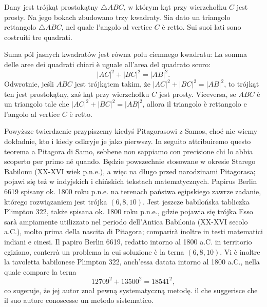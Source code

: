 \begin{theorem}
[Pitagorasa] %
[di Pitagora] %
\label{theorem_pythagorean}%
    Dany jest trójkąt prostokątny $\triangle ABC$, w którym kąt przy wierzchołku $C$ jest prosty. %
    Na jego bokach zbudowano trzy kwadraty. %
    Sia dato un triangolo rettangolo $\triangle ABC$, nel quale l'angolo al vertice $C$ è retto. %
    Sui suoi lati sono costruiti tre quadrati. %
    \begin{center}

    \end{center}
    Suma pól jasnych kwadratów jest równa polu ciemnego kwadratu: %
    La somma delle aree dei quadrati chiari è uguale all'area del quadrato scuro: %
    \begin{equation}
        |AC|^2 + |BC|^2 = |AB|^2.
    \end{equation}
    Odwrotnie, jeśli $ABC$ jest trójkątem takim, że $|AC|^2 + |BC|^2 = |AB|^2$, to trójkąt ten jest prostokątny, zaś kąt przy wierzchołku $C$ jest prosty. %
    Viceversa, se $ABC$ è un triangolo tale che $|AC|^2 + |BC|^2 = |AB|^2$, allora il triangolo è rettangolo e l'angolo al vertice $C$ è retto. %
\end{theorem}

Powyższe twierdzenie przypiszemy kiedyś Pitagorasowi z Samos, choć nie wiemy dokładnie, kto i kiedy odkryje je jako pierwszy. %
In seguito attribuiremo questo teorema a Pitagora di Samo, sebbene non sappiamo con precisione chi lo abbia scoperto per primo né quando. %
Będzie powszechnie stosowane w okresie Starego Babilonu (XX-XVI wiek p.n.e.), a więc na długo przed narodzinami Pitagorasa; pojawi się też w indyjskich i chińskich tekstach matematycznych. %
Papirus Berlin 6619 spisany ok. 1800 roku p.n.e. na terenach państwa egipskiego zawrze zadanie, którego rozwiązaniem jest trójka $(6, 8, 10)$. %
Jest jeszcze babilońska tabliczka Plimpton 322, także spisana ok. 1800 roku p.n.e., gdzie pojawia się trójka %
Esso sarà ampiamente utilizzato nel periodo dell'Antica Babilonia (XX-XVI secolo a.C.), molto prima della nascita di Pitagora; comparirà inoltre in testi matematici indiani e cinesi. %
Il papiro Berlin 6619, redatto intorno al 1800 a.C. in territorio egiziano, conterrà un problema la cui soluzione è la terna $(6, 8, 10)$. %
Vi è inoltre la tavoletta babilonese Plimpton 322, anch'essa datata intorno al 1800 a.C., nella quale compare la terna %
\begin{equation}
    12709^2 + 13500^2 = 18541^2,
\end{equation}
co sugeruje, że jej autor znał pewną systematyczną metodę. %
il che suggerisce che il suo autore conoscesse un metodo sistematico. %

